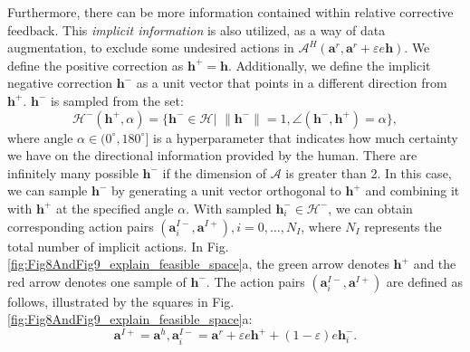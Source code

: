 Furthermore, there can be more information contained within relative corrective feedback. This \emph{implicit information} is also utilized, as a way of data augmentation, to exclude some undesired actions in $\mathcal{A}^H{ (\bm a^r, \bm a^r \!\!+ \varepsilon e \bm h)}$. 
We define the positive correction as $\bm h^{+} \!\!\!=\! \bm h$. Additionally, we define the implicit negative correction $\bm h^{-}$ as a unit vector that points in a different direction from $\bm h^{+}$.
$\bm h^{-}$ is sampled from the set: 
\begin{equation*}
 \mathcal{H}^{-}(\bm h^{+}, \alpha) = \{ \bm h^{-} \in \mathcal{H} | \, \, \| \bm h^{-} \| = 1,  \angle(\bm h^{-}, \bm h^{+}) = \alpha \}, 
 \label{eq:assumption_negative_correction}
\end{equation*}
where angle $\alpha \in (0^\circ, 180^\circ]$ is a hyperparameter that indicates how much certainty we have on the directional information provided by the human. 
There are infinitely many possible $\bm h^{-}$ if the dimension of $\mathcal{A}$ is greater than 2. 
In this case, we can sample $\bm h^{-}$ by generating a unit vector orthogonal to \(\bm h^{+}\) and combining it with \(\bm h^{+}\) at the specified angle \(\alpha\).
With sampled $\bm h^{-}_i \in \mathcal{H}^{-}$, we can obtain corresponding action pairs $(\bm a^{I-}_i, \bm a^{I+}), i=0,\dots, N_I$, where $N_I$ represents the total number of implicit actions.
In Fig. \ref{fig:Fig8AndFig9_explain_feasible_space}a, the green arrow denotes $\bm h^{+}$ and the red arrow denotes one sample of $\bm h^{-}$.
The action pairs ${(\bm a^{I-}_i, \bm a^{I+})}$ are defined as follows, illustrated by the squares in Fig. \ref{fig:Fig8AndFig9_explain_feasible_space}a:
\begin{equation*}
    \bm a^{I+} = \bm a^h,
     \bm a^{I-}_i = \bm a^{r} + \varepsilon e  \bm h^{+} + (1-\varepsilon) e \bm h^{-}_i.
     \label{eq:implicit_action_pairs}
\end{equation*}


